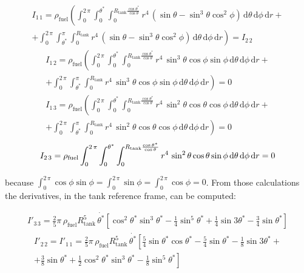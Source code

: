 \begin{multline}
	I_{1\,1} =\rho_{\text{fuel}} \left(\int_{0}^{2\,\pi}\int_{0}^{\theta^*}\int_{0}^{R_{\text{tank}}\frac{\cos{\theta^*}}{\cos{\theta}}} r^4\,\left(\sin{\theta}-\sin^3{\theta}\cos^2{\phi}\right)\,\text{d}\theta\,\text{d}\phi\,\text{d}r+\right.\\
	\left.+ \int_{0}^{2\,\pi}\int_{\theta^*}^{\pi}\int_{0}^{R_{\text{tank}}} r^4\,\left(\sin{\theta}-\sin^3{\theta}\cos^2{\phi}\right)\,\text{d}\theta\,\text{d}\phi\,\text{d}r\right) = I_{2\,2}
\end{multline}
\vspace{3pt}
\begin{multline}
	I_{1\,2} = \rho_{\text{fuel}} \left(\int_{0}^{2\,\pi}\int_{0}^{\theta^*}\int_{0}^{R_{\text{tank}}\frac{\cos{\theta^*}}{\cos{\theta}}} r^4\,\sin^3{\theta}\cos{\phi}\sin{\phi}\,\text{d}\theta\,\text{d}\phi\,\text{d}r \right.+\\
	\left.+\int_{0}^{2\,\pi}\int_{\theta^*}^{\pi}\int_{0}^{R_{\text{tank}}} r^4\,\sin^3{\theta}\cos{\phi}\sin{\phi}\,\text{d}\theta\,\text{d}\phi\,\text{d}r\right)= 0
\end{multline}
\vspace{3pt}
\begin{multline}
	I_{1\,3} = \rho_{\text{fuel}} \left(\int_{0}^{2\,\pi}\int_{0}^{\theta^*}\int_{0}^{R_{\text{tank}}\frac{\cos{\theta^*}}{\cos{\theta}}} r^4\,\sin^2{\theta}\cos{\theta}\cos{\phi}\,\text{d}\theta\,\text{d}\phi\,\text{d}r\right.+\\
	+\int_{0}^{2\,\pi}\int_{\theta^*}^{\pi}\int_{0}^{R_{\text{tank}}} r^4\,\sin^2{\theta}\cos{\theta}\cos{\phi}\,\text{d}\theta\,\text{d}\phi\,\text{d}r\left.\right) = 0
\end{multline}
\vspace{3pt}
\begin{multline}
	I_{2\,3} = \rho_{\text{fuel}} \int_{0}^{2\,\pi}\int_{0}^{\theta^*}\int_{0}^{R_{\text{tank}}\frac{\cos{\theta^*}}{\cos{\theta}}} r^4\,\sin^2{\theta}\cos{\theta}\sin{\phi}\,\text{d}\theta\,\text{d}\phi\,\text{d}r = 0 \vspace{5pt}
\end{multline}
\noindent
because $\int_{0}^{2\,\pi}\cos{\phi}\sin{\phi} =\int_{0}^{2\,\pi}\sin{\phi} = \int_{0}^{2\,\pi}\cos{\phi}=0 $.\newline
From those calculations the derivatives, in the tank reference frame, can be computed:

\begin{multline}
	I'_{3\,3}	= \frac{2}{5}\pi\,\rho_{\text{fuel}}R^5_{\text{tank}} \, \dot{\theta^*}\left[ \cos^2{\theta^*}\sin^3{\theta^*} -\frac{1}{4}\sin^5{\theta^*} +\frac{1}{4}\sin{3\theta^*} -\frac{3}{4}\sin{\theta^*} \right]
\end{multline}
\begin{multline}
	I'_{2\,2}	= I'_{1\,1}= \frac{2}{5}\pi\,\rho_{\text{fuel}}R^5_{\text{tank}} \, \dot{\theta^*}\left[ \frac{5}{4}\sin{\theta^*}\cos{\theta^*} -\frac{5}{4}\sin{\theta^*} -\frac{1}{8}\sin{3\theta^*} +\right.\\
	\left. + \frac{3}{8} \sin{\theta^*} + \frac{1}{2}\cos^2{\theta^*}\sin^3{\theta^*} -\frac{1}{8} \sin^5{\theta^*} \right]
\end{multline}

